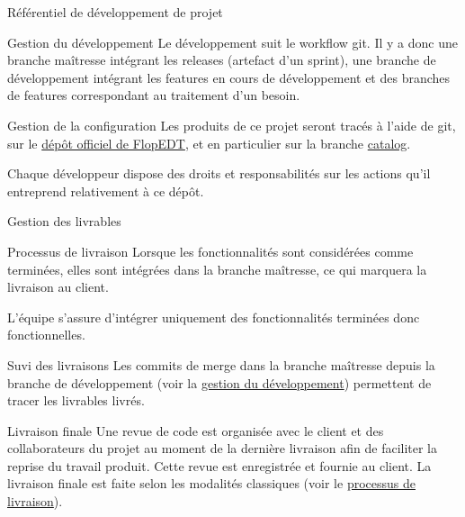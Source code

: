 \documentclass[]{article}
\begin{document}
{\begin{section}{\label{sec:Référentiel de développement de projet}Référentiel de développement de projet}
     \begin{subsection}{\label{sec:Gestion du développement}Gestion du développement}
         Le développement suit le workflow git. Il y a donc une branche maîtresse intégrant les releases (artefact d’un sprint), une branche de développement intégrant les features en cours de développement et des branches de features correspondant au traitement d’un besoin.
     \end{subsection}

     \begin{subsection}{\label{sec:Gestion de la configuration}Gestion de la configuration}
         Les produits de ce projet seront tracés à l'aide de git, sur le \href{https://framagit.org/flopedt/FlOpEDT}{dépôt officiel de FlopEDT}, et en particulier sur la branche \href{https://framagit.org/flopedt/FlOpEDT/-/tree/catalog}{catalog}.

         Chaque développeur dispose des droits et responsabilités sur les actions qu'il entreprend relativement à ce dépôt.
     \end{subsection}

     \begin{subsection}{\label{sec:Gestion des livrables}Gestion des livrables}
         \begin{subsubsection}{\label{sec:Processus de livraison}Processus de livraison}
             Lorsque les fonctionnalités sont considérées comme terminées, elles sont intégrées dans la branche maîtresse, ce qui marquera la livraison au client.

             L’équipe s’assure d’intégrer uniquement des fonctionnalités terminées donc fonctionnelles.
         \end{subsubsection}

         \begin{subsubsection}{\label{sec:Suvi des livraisons}Suvi des livraisons}
             Les commits de merge dans la branche maîtresse depuis la branche de développement (voir la \hyperref[sec:Gestion du développement]{gestion du développement}) permettent de tracer les livrables livrés.
         \end{subsubsection}

         \begin{subsubsection}{\label{sec:Livraison finale}Livraison finale}
             Une revue de code est organisée avec le client et des collaborateurs du projet au moment de la dernière livraison afin de faciliter la reprise du travail produit. Cette revue est enregistrée et fournie au client. La livraison finale est faite selon les modalités classiques (voir le \hyperref[sec:Processus de livraison]{processus de livraison}).
         \end{subsubsection}
     \end{subsection}


\end{section}}
\end{document}

